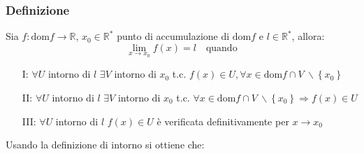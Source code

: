 \documentclass[a4paper]{article}
\newcommand\dom{\text{dom}}
\begin{document}
\subsubsection*{Definizione}
Sia \(f: \dom f \to \mathbb{R}\), \(x_0 \in \mathbb{R}^*\) punto di accumulazione di \(\dom f\) e \(l \in \mathbb{R}^*\), allora:
\[\lim_{x \to x_0} f(x) = l \quad \text{quando}\]
\begin{itemize}
	\item[I: ] \(\forall U\) intorno di \(l\) \(\exists V\) intorno di \(x_0\) t.c. \(f(x) \in U, \forall x \in \dom f \cap V \  \backslash \left\{ x_0 \right\}\)
	\item[II: ] \(\forall U\) intorno di \(l\) \(\exists V\) intorno di \(x_0\) t.c. \(\forall x \in \dom f \cap V \  \backslash \left\{ x_0 \right\} \Rightarrow f(x) \in U\)
	\item[III: ] \(\forall U\) intorno di \(l\) \(f(x) \in U\) è verificata definitivamente per \(x \to x_0\)
\end{itemize}
Usando la definizione di intorno si ottiene che:
\end{document}
